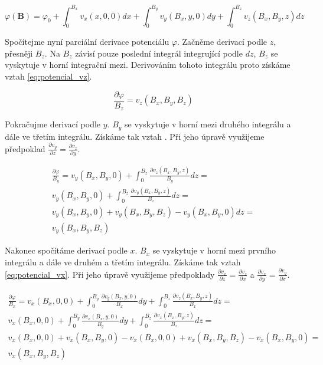 \documentclass{book}
\newcommand{\vect}[1]{\boldsymbol{#1}}
\begin{document}
\begin{equation}
\label{eq:potencial_7}
\varphi(\vect{B}) = \varphi_0 + \int_0^{B_x} v_x(x, 0, 0) dx + \int_0^{B_y} v_y(B_x, y, 0) dy  + \int_0^{B_z} v_z(B_x, B_y, z) dz
\end{equation}

Spočítejme nyní parciální derivace potenciálu \(\varphi\). Začněme derivací podle \(z\), přesněji \(B_z\). Na \(B_z\) závisí pouze poslední integrál
integrující podle \(dz\), \(B_z\) se vyskytuje v horní integrační mezi. Derivováním tohoto integrálu proto získáme vztah \eqref{eq:potencial_vz}.

\begin{equation}
\label{eq:potencial_vz}
\frac{\partial \varphi}{B_z} = v_z(B_x, B_y, B_z)
\end{equation}

Pokračujme derivací podle \(y\). \(B_y\) se vyskytuje v horní mezi druhého integrálu a dále ve třetím integrálu. Získáme tak vztah \label{eq:potencial_vy}.
Při jeho úpravě využijeme předpoklad \(\frac{\partial v_y}{\partial z} = \frac{\partial v_z}{\partial y}\).

\begin{equation}
\label{eq:potencial_vy}
\begin{split}
\frac{\partial \varphi}{B_y} = v_y(B_x, B_y, 0) + \int_0^{B_z} \frac{\partial v_z(B_x, B_y, z)}{B_y} dz = \\
v_y(B_x, B_y, 0) + \int_0^{B_z} \frac{\partial v_y(B_x, B_y, z)}{B_z} dz = \\
v_y(B_x, B_y, 0) + v_y(B_x, B_y, B_z) - v_y(B_x, B_y, 0) dz = \\
v_y(B_x, B_y, B_z)
\end{split}
\end{equation}

Nakonec spočítáme derivací podle \(x\). \(B_x\) se vyskytuje v horní mezi prvního integrálu a dále ve druhém a třetím integrálu. Získáme tak vztah \eqref{eq:potencial_vx}. Při jeho úpravě využijeme předpoklady \(\frac{\partial v_x}{\partial z} = \frac{\partial v_z}{\partial x}\) a
\(\frac{\partial v_x}{\partial y} = \frac{\partial v_y}{\partial x}\).

\begin{equation}
\label{eq:potencial_vx}
\begin{split}
\frac{\partial \varphi}{B_x} = v_x(B_x, 0, 0) + \int_0^{B_y} \frac{\partial v_y(B_x, y, 0)}{B_x} dy + \int_0^{B_z} \frac{\partial v_z(B_x, B_y, z)}{B_x} dz = \\
v_x(B_x, 0, 0) + \int_0^{B_y} \frac{\partial v_x(B_x, y, 0)}{B_y} dy + \int_0^{B_z} \frac{\partial v_x(B_x, B_y, z)}{B_z} dz = \\
v_x(B_x, 0, 0) + v_x(B_x, B_y, 0) - v_x(B_x, 0, 0) + v_x(B_x, B_y, B_z) - v_x(B_x, B_y, 0) = \\
v_x(B_x, B_y, B_z)
\end{split}
\end{equation}
\end{document}
